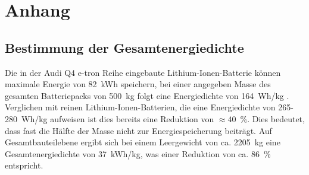 \chapter{\label{ch:anhang} Anhang}

\section{\label{ch:AudiEnergie}Bestimmung der Gesamtenergiedichte}

Die in der Audi Q4 e-tron Reihe eingebaute Lithium-Ionen-Batterie können maximale Energie von 82~kWh speichern, bei einer angegeben Masse des gesamten Batteriepacks von 500~kg folgt eine Energiedichte von 164~Wh/kg \cite{Radu2021,Audi2022}. Verglichen mit reinen Lithium-Ionen-Batterien, die eine Energiedichte von 265-280~Wh/kg \cite{Armand2020} aufweisen ist dies bereits eine Reduktion von $\approx 40$~\%. Dies bedeutet, dass fast die Hälfte der Masse nicht zur Energiespeicherung beiträgt. Auf Gesamtbauteilebene ergibt sich bei einem Leergewicht von ca. 2205~kg \cite{Audi2022} eine Gesamtenergiedichte von 37~kWh/kg, was einer Reduktion von ca. 86~\% entspricht.